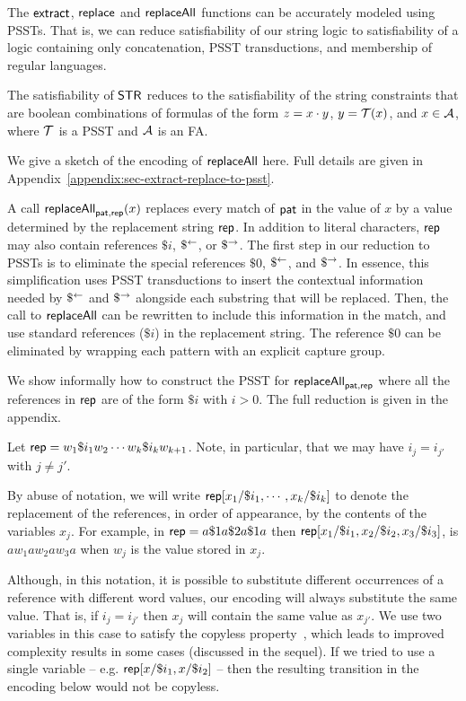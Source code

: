 
The $\mathsf{extract}$, $\mathsf{replace}$ and $\mathsf{replaceAll}$ functions can be accurately modeled using PSSTs.
That is, we can reduce satisfiability of our string logic to satisfiability of a logic containing only concatenation, PSST transductions, and membership of regular languages.

\begin{lemma}\label{lem-str-fun-to-psst}
    The satisfiability of $\mathsf{STR}$ reduces to the satisfiability of the string constraints that are boolean combinations of formulas of the form $z=x \cdot y$, $y=\mathcal{T}(x)$, and $x \in \mathcal{A}$, where $\mathcal{T}$ is a PSST and $\mathcal{A}$ is an FA.
\end{lemma}

We give a sketch of the encoding of $\mathsf{replaceAll}$ here.
Full details are given in Appendix~\ref{appendix:sec-extract-replace-to-psst}.

A call $\mathsf{replaceAll}_{\mathsf{pat}, \mathsf{rep}}(x)$ replaces every match of $\mathsf{pat}$ in the value of $x$ by a value determined by the replacement string $\mathsf{rep}$.
In addition to literal characters, $\mathsf{rep}$ may also contain references $\$i$, $\$^{\leftarrow}$, or $\$^{\rightarrow}$.
The first step in our reduction to PSSTs is to eliminate the special references $\$0$, $\$^{\leftarrow}$, and $\$^{\rightarrow}$.
In essence, this simplification uses PSST transductions to insert the contextual information needed by $\$^{\leftarrow}$ and $\$^{\rightarrow}$ alongside each substring that will be replaced.
Then, the call to $\mathsf{replaceAll}$ can be rewritten to include this information in the match, and use standard references ($\$i$) in the replacement string.
The reference $\$0$ can be eliminated by wrapping each pattern with an explicit capture group.

We show informally how to construct the PSST for $\mathsf{replaceAll}_{\mathsf{pat}, \mathsf{rep}}$ where all the references in $\mathsf{rep}$ are of the form $\$i$ with $i > 0$.
The full reduction is given in the appendix.

Let $\mathsf{rep} = w_1 \$i_1 w_2 \cdots w_k \$i_k w_{k+1}$.
Note, in particular, that we may have $i_j = i_{j'}$ with $j \neq j'$.

By abuse of notation, we will write
$\mathsf{rep}[x_1/\$i_1,\cdots,x_k/\$i_k]$
to denote the replacement of the references, in order of appearance, by the contents of the variables $x_j$.
For example, in
$\mathsf{rep} = a \$1 a \$2 a \$1 a$
then
$\mathsf{rep}[x_1/\$i_1, x_2/\$i_2,x_3/\$i_3]$,
is $a w_1 a w_2 a w_3 a$ when $w_j$ is the value stored in $x_j$.

Although, in this notation, it is possible to substitute different occurrences of a reference with different word values, our encoding will always substitute the same value.
That is, if $i_j = i_{j'}$ then $x_j$ will contain the same value as $x_{j'}$.
We use two variables in this case to satisfy the copyless property~\cite{AC10}, which leads to improved complexity results in some cases (discussed in the sequel).
If we tried to use a single variable – e.g. $\mathsf{rep}[x/\$i_1,x/\$i_2]$ – then the resulting transition in the encoding below would not be copyless.

